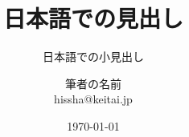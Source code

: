 \documentclass[dvipdfmx,aspectratio=43]{beamer}
\begin{document}
\title{日本語での見出し}
\subtitle{日本語での小見出し}
\author{筆者の名前\\hissha@keitai.jp}
\date{\today}

\frame[plain]{\maketitle}
\end{document}
